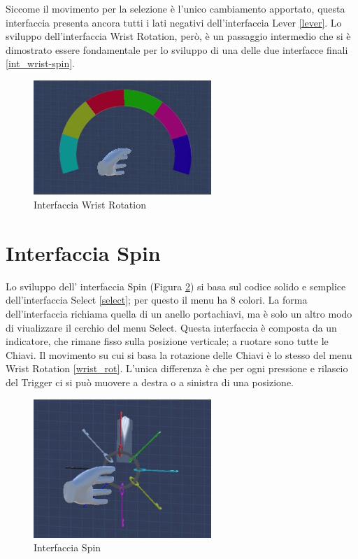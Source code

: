 \documentclass[target=bach,aauheader=]{thud}
\begin{document}
Siccome il movimento per la selezione è l'unico cambiamento apportato, questa interfaccia presenta ancora tutti i lati negativi dell'interfaccia Lever \ref{lever}.
Lo sviluppo dell'interfaccia Wrist Rotation, però, è un passaggio intermedio che si è dimostrato essere fondamentale per lo sviluppo di una delle due interfacce finali \ref{int_wrist-spin}.

\begin{figure}[h]
    \centering
    \includegraphics[width=0.60\textwidth]{wrist_rot}
    \caption{Interfaccia Wrist Rotation}
    \label{fig:wrist_rot}
\end{figure}

\section{Interfaccia Spin} %
\label{spin}
Lo sviluppo dell' interfaccia Spin (Figura \ref{fig:spin}) si basa sul codice solido e semplice dell'interfaccia Select \ref{select}; per questo il menu ha 8 colori.
La forma dell'interfaccia richiama quella di un anello portachiavi, ma è solo un altro modo di viualizzare il cerchio del menu Select.
Questa interfaccia è composta da un indicatore, che rimane fisso sulla posizione verticale; a ruotare sono tutte le Chiavi.
Il movimento su cui si basa la rotazione delle Chiavi è lo stesso del menu Wrist Rotation \ref{wrist_rot}.
L'unica differenza è che per ogni pressione e rilascio del Trigger ci si può muovere a destra o a sinistra di una posizione. \\

\begin{figure}[h]
    \centering
    \includegraphics[width=0.60\textwidth]{spin}
    \caption{Interfaccia Spin}
    \label{fig:spin}
\end{figure}
\end{document}
